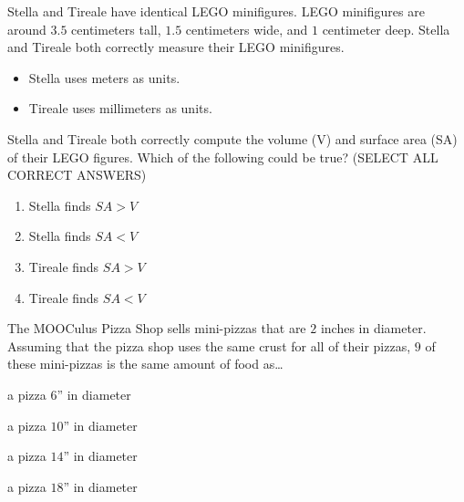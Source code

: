 \documentclass{ximera}
\begin{document}
\begin{exercise}
Stella and Tireale have identical LEGO minifigures. LEGO minifigures
are around $3.5$ centimeters tall, $1.5$ centimeters wide, and $1$
centimeter deep. Stella and Tireale both correctly measure their LEGO
minifigures.
\begin{multicols}{2}
  \begin{itemize}
\item Stella uses meters as units.
\item Tireale uses millimeters as units.
  \end{itemize}
\end{multicols}
Stella and Tireale both correctly compute the volume (V) and surface
area (SA) of their LEGO figures.  Which of the following could be
true? (SELECT ALL CORRECT ANSWERS)
\begin{multicols}{2}
\begin{enumerate}
\item Stella finds $SA > V$
\item Stella finds $SA < V$
\item Tireale finds $SA > V$
\item Tireale finds $SA < V$
\end{enumerate}
\end{multicols}
\end{exercise}



\begin{exercise}
  The MOOCulus Pizza Shop sells mini-pizzas that are $2$ inches in
  diameter. Assuming that the pizza shop uses the same crust for all
  of their pizzas, $9$ of these mini-pizzas is the same amount of food
  as\dots
  \begin{enumerate}
    \begin{multicols}{2}
    \item a pizza $6$'' in diameter
    \item a pizza $10$'' in diameter
    \item a pizza $14$'' in diameter
    \item a pizza $18$'' in diameter
    \end{multicols}
  \end{enumerate}
\end{exercise}




\end{document}
